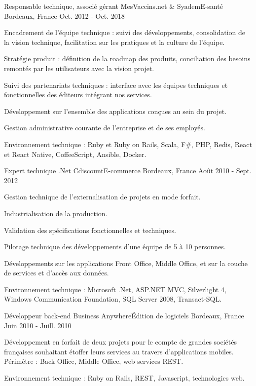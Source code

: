\begin{cventries}
  \cventry
    {Responsable technique, associé gérant}
    {MesVaccins.net \& Syadem{\enskip\cdotp\enskip}E-santé}
    {Bordeaux, France}
    {Oct. 2012 - Oct. 2018}
    {
      \begin{cvitems}
        \item {Encadrement de l'équipe technique : suivi des développements, consolidation de la vision technique, facilitation sur les pratiques et la culture de l'équipe.}
        \item {Stratégie produit : définition de la roadmap des produits, conciliation des besoins remontés par les utilisateurs avec la vision projet.}
        \item {Suivi des partenariats techniques : interface avec les équipes techniques et fonctionnelles des éditeurs intégrant nos services.}
        \item {Développement sur l'ensemble des applications conçues au sein du projet.}
        \item {Gestion administrative courante de l'entreprise et de ses employés.}
        \item {Environnement technique : Ruby et Ruby on Rails, Scala, F\#, PHP, Redis, React et React Native, CoffeeScript, Ansible, Docker.}
      \end{cvitems}
    }

  \cventry
    {Expert technique .Net}
    {Cdiscount{\enskip\cdotp\enskip}E-commerce}
    {Bordeaux, France}
    {Août 2010 - Sept. 2012}
    {
      \begin{cvitems}
        \item {Gestion technique de l'externalisation de projets en mode forfait.}
        \item {Industrialisation de la production.}
        \item {Validation des spécifications fonctionnelles et techniques.}
        \item {Pilotage technique des développements d'une équipe de 5 à 10 personnes.}
        \item {Développements sur les applications Front Office, Middle Office, et sur la couche de services et d'accès aux données.}
        \item {Environnement technique : Microsoft .Net, ASP.NET MVC, Silverlight 4, Windows Communication Foundation, SQL Server 2008, Transact-SQL.}
      \end{cvitems}
    }

  \cventry
    {Développeur back-end}
    {Business Anywhere{\enskip\cdotp\enskip}Édition de logiciels}
    {Bordeaux, France}
    {Juin 2010 - Juill. 2010}
    {
      \begin{cvitems}
        \item {Développement en forfait de deux projets pour le compte de grandes sociétés françaises souhaitant étoffer leurs services au travers d'applications mobiles. Périmètre : Back Office, Middle Office, web services REST.}
        \item {Environnement technique : Ruby on Rails, REST, Javascript, technologies web.}
      \end{cvitems}
    }


\end{cventries}
